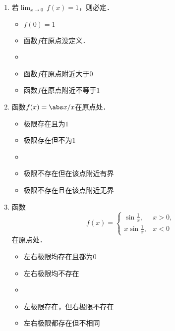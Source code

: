\begin{enumerate}
\item 若\(\lim_{x\to0} \,f(x) = 1\)，则必定\uline{\makebox[6em]{}}．
  \begin{itemize}
    \renewcommand{\labelitemi}{\faCircleThin}
  \item \(f(0) = 1\)
  \item 函数\(f\)在原点没定义．
    \ifshowsol
  \item[\faCircle]
    \else
  \item
    \fi
    函数\(f\)在原点附近大于\(0\)
  \item 函数\(f\)在原点附近不等于\(1\)
  \end{itemize}

\item 函数\(f(x) = \abs x / x\)在原点处\uline{\makebox[6em]{}}．
  \begin{itemize}
    \renewcommand{\labelitemi}{\faCircleThin}
  \item 极限存在且为\(1\)
  \item 极限存在但不为\(1\)
    \ifshowsol
  \item[\faCircle]
    \else
  \item
    \fi
    极限不存在但在该点附近有界
  \item 极限不存在且在该点附近无界
  \end{itemize}

\item 函数
  \begin{equation*}
    f(x) =
    \begin{cases}
      \sin\frac1x, & x > 0, \\
      x \sin\frac1x, & x < 0
    \end{cases}
  \end{equation*}
  在原点处\uline{\makebox[6em]{}}．
  \begin{itemize}
    \renewcommand{\labelitemi}{\faCircleThin}
  \item 左右极限均存在且都为\(0\)
  \item 左右极限均不存在
    \ifshowsol
  \item[\faCircle]
    \else
  \item
    \fi
    左极限存在，但右极限不存在
  \item 左右极限都存在但不相同
  \end{itemize}


\end{enumerate}
